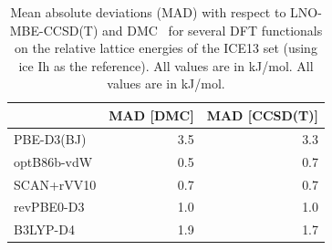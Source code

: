 \begin{table}[h]

\caption{\label{tab:ice13_dft_rel_ene_mad}Mean absolute deviations (MAD) with respect to LNO-MBE-CCSD(T) and DMC~\cite{dellapiaDMCICE13AmbientHigh2022b} for several DFT functionals on the relative lattice energies of the ICE13 set (using ice Ih as the reference). All values are in kJ/mol. All values are in kJ/mol.}
\begin{tabular}{lrr}
\toprule
 & MAD [DMC] & MAD [CCSD(T)] \\ 
\midrule
PBE-D3(BJ) & 3.5 & 3.3 \\
optB86b-vdW & 0.5 & 0.7 \\
SCAN+rVV10 & 0.7 & 0.7 \\
revPBE0-D3 & 1.0 & 1.0 \\
B3LYP-D4 & 1.9 & 1.7 \\
\bottomrule
\end{tabular}

\end{table}